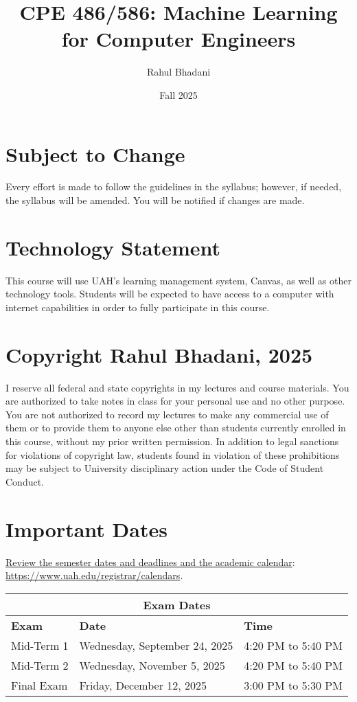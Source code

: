 \documentclass[12pt,nohyper,nobib,xcolor=dvipsnames,svgnames,x11names]{tufte-book}
\title{CPE 486/586: Machine Learning for Computer Engineers}
\date{Fall 2025}
\author[Rahul Bhadani]{Rahul Bhadani}
\begin{document}
\maketitle

\newpage

\section*{Subject to Change}
Every effort is made to follow the guidelines in the syllabus; however, if needed, the syllabus will be amended. You will be notified if changes are made.

\section*{Technology Statement}
This course will use UAH’s learning management system, Canvas, as well as other technology tools. Students will be expected to have access to a computer with internet capabilities in order to fully participate in this course. 



\section{Copyright Rahul Bhadani, 2025}

I reserve all federal and state copyrights in my lectures and course materials. You are authorized to take notes in class for your personal use and no other purpose. You are not authorized to record my lectures to make any commercial use of them or to provide them to anyone else other than students currently enrolled in this course, without my prior written permission. In addition to legal sanctions for violations of copyright law, students found in violation of these prohibitions may be subject to University disciplinary action under the Code of Student Conduct.

\section*{Important Dates}
\href{https://www.uah.edu/registrar/calendars}{Review the semester dates and deadlines and the academic calendar}: \url{https://www.uah.edu/registrar/calendars}.

\vspace{15pt}

\begin{tabular}{|p{3cm}|p{5cm}|p{5cm}|}
\hline
\multicolumn{3}{|c|}{\textbf{Exam Dates}} \\ \hline
\textbf{Exam} & \textbf{Date} & \textbf{Time} \\ \hline
Mid-Term 1 & Wednesday, September 24, 2025 & 4:20 PM to 5:40 PM\\ \hline
Mid-Term 2 & Wednesday, November 5, 2025 & 4:20 PM to 5:40 PM\\ \hline
Final Exam & Friday, December 12, 2025 & 3:00 PM to 5:30 PM\\ \hline
\end{tabular}
\end{document}
